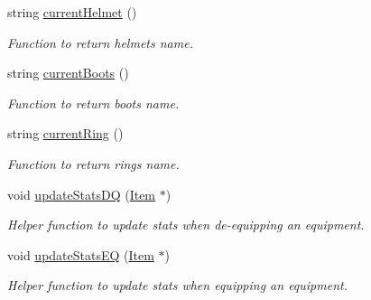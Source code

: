 \begin{DoxyCompactItemize}
\hypertarget{class_characters_a26db054e9899a900b62d105d5bf2b20c}{}\label{class_characters_a26db054e9899a900b62d105d5bf2b20c} 
string \hyperlink{class_characters_a26db054e9899a900b62d105d5bf2b20c}{current\+Helmet} ()
\begin{DoxyCompactList}\small\item\em Function to return helmet\textquotesingle{}s name. \end{DoxyCompactList}\item 
\hypertarget{class_characters_a9f6a49663aceb01d8a5391d75482a224}{}\label{class_characters_a9f6a49663aceb01d8a5391d75482a224} 
string \hyperlink{class_characters_a9f6a49663aceb01d8a5391d75482a224}{current\+Boots} ()
\begin{DoxyCompactList}\small\item\em Function to return boots\textquotesingle{} name. \end{DoxyCompactList}\item 
\hypertarget{class_characters_a02fd5bc3c6122b602d6aaf329a8cdaba}{}\label{class_characters_a02fd5bc3c6122b602d6aaf329a8cdaba} 
string \hyperlink{class_characters_a02fd5bc3c6122b602d6aaf329a8cdaba}{current\+Ring} ()
\begin{DoxyCompactList}\small\item\em Function to return ring\textquotesingle{}s name. \end{DoxyCompactList}\item 
\hypertarget{class_characters_a0c8704124611ae8a358e26b584fede4e}{}\label{class_characters_a0c8704124611ae8a358e26b584fede4e} 
void \hyperlink{class_characters_a0c8704124611ae8a358e26b584fede4e}{update\+Stats\+DQ} (\hyperlink{class_item}{Item} $\ast$)
\begin{DoxyCompactList}\small\item\em Helper function to update stats when de-\/equipping an equipment. \end{DoxyCompactList}\item 
\hypertarget{class_characters_a1ba5a872f62151bad5874d6b36b8d141}{}\label{class_characters_a1ba5a872f62151bad5874d6b36b8d141} 
void \hyperlink{class_characters_a1ba5a872f62151bad5874d6b36b8d141}{update\+Stats\+EQ} (\hyperlink{class_item}{Item} $\ast$)
\begin{DoxyCompactList}\small\item\em Helper function to update stats when equipping an equipment. \end{DoxyCompactList}\item 
\hypertarget{class_characters_ac7e98c3ef453dad9f68b180438d27a0f}{}\label{class_characters_ac7e98c3ef453dad9f68b180438d27a0f} 

\end{DoxyCompactItemize}
